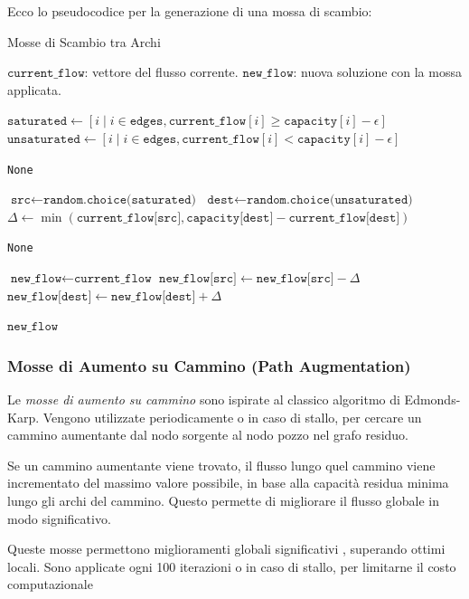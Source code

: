 \documentclass[12pt,a4paper]{article}
\begin{document}
Ecco lo pseudocodice per la generazione di una mossa di scambio:

\begin{algorithm}[H]
\caption{Mosse di Scambio tra Archi}
\label{alg:edge_exchange_moves}
\begin{algorithmic}[1]
\REQUIRE $\texttt{current\_flow}$: vettore del flusso corrente.
\ENSURE $\texttt{new\_flow}$: nuova soluzione con la mossa applicata.

\STATE $ \texttt{saturated} \gets [i \mid i \in \texttt{edges}, \texttt{current\_flow}[i] \geq \texttt{capacity}[i] - \epsilon] $
\STATE $ \texttt{unsaturated} \gets [i \mid i \in \texttt{edges}, \texttt{current\_flow}[i] < \texttt{capacity}[i] - \epsilon] $

    \RETURN \texttt{None}
\ENDIF

\STATE $ \texttt{src} \gets \texttt{random.choice(saturated)} $
\STATE $ \texttt{dest} \gets \texttt{random.choice(unsaturated)} $
\STATE $ \Delta \gets
\min(\texttt{current\_flow[src]}, \texttt{capacity[dest]} - \texttt{current\_flow[dest]}) $

\IF{ $\Delta \leq \epsilon $ }
    \RETURN \texttt{None}
\ENDIF

\STATE $ \texttt{new\_flow} \gets \texttt{current\_flow} $
\STATE $ \texttt{new\_flow[src]} \gets \texttt{new\_flow[src]} - \Delta $
\STATE $ \texttt{new\_flow[dest]} \gets \texttt{new\_flow[dest]} + \Delta $

\RETURN $\texttt{new\_flow}$
\end{algorithmic}
\end{algorithm}

\subsubsection{Mosse di Aumento su Cammino (Path Augmentation)}

Le \textit{mosse di aumento su cammino} sono ispirate al classico algoritmo di Edmonds-Karp. Vengono utilizzate periodicamente o in caso di stallo, per cercare un cammino aumentante dal nodo sorgente al nodo pozzo nel grafo residuo.

Se un cammino aumentante viene trovato, il flusso lungo quel cammino viene incrementato del massimo valore possibile, in base alla capacità residua minima lungo gli archi del cammino. Questo permette di migliorare il flusso globale in modo significativo.

Queste mosse permettono miglioramenti globali significativi , superando ottimi locali.
Sono applicate ogni 100 iterazioni o in caso di stallo, per limitarne il costo computazionale
\end{document}
